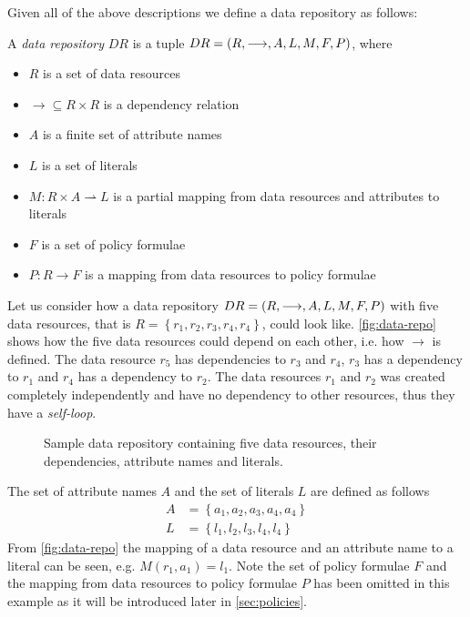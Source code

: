 Given all of the above descriptions we define a data repository as follows:
\begin{definition}
A \emph{data repository} $DR$ is a tuple $DR= \left( R, \longrightarrow, A, L, M, F, P \right)$, where
\begin{itemize}
  \item $R$ is a set of data resources
  \item $\longrightarrow \subseteq R \times R$ is a dependency relation
  \item $A$ is a finite set of attribute names
  \item $L$ is a set of literals
  \item $M : R \times A \rightharpoonup L$ is a partial mapping from data resources and attributes to literals
  \item $F$ is a set of policy formulae
  \item $P : R \rightarrow F$ is a mapping from data resources to policy formulae
\end{itemize}
\end{definition}

\begin{example}\label{ex:data-repo}
Let us consider how a data repository $DR= \left( R, \longrightarrow, A, L, M, F, P \right)$ with five data resources, that is $R = \left\{ r_1, r_2, r_3, r_4, r_4 \right\}$, could look like. \autoref{fig:data-repo} shows how the five data resources could depend on each other, i.e. how $\longrightarrow$ is defined. The data resource $r_5$ has dependencies to $r_3$ and $r_4$, $r_3$ has a dependency to $r_1$ and $r_4$ has a dependency to $r_2$. The data resources $r_1$ and $r_2$ was created completely independently and have no dependency to other resources, thus they have a \emph{self-loop}.
\begin{figure}[!ht] 
    \begin{center}
        
        \caption{Sample data repository containing five data resources, their dependencies, attribute names and literals.}
        \label{fig:data-repo}
    \end{center}
\end{figure}
The set of attribute names $A$ and the set of literals $L$ are defined as follows
\begin{align*}
    A &= \left\{ a_1, a_2, a_3, a_4, a_4 \right\} \\
    L &= \left\{ l_1, l_2, l_3, l_4, l_4 \right\}
\end{align*}
From \autoref{fig:data-repo} the mapping of a data resource and an attribute name to a literal can be seen, e.g. $M(r_1, a_1) = l_1$. Note the set of policy formulae $F$ and the mapping from data resources to policy formulae $P$ has been omitted in this example as it will be introduced later in \autoref{sec:policies}.
\end{example}

